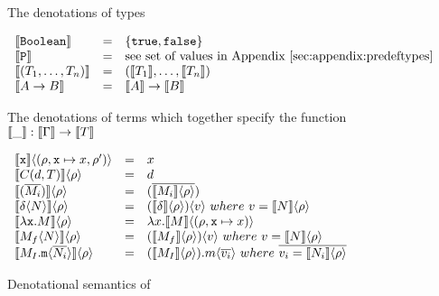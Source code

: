 \begin{figure}[h]
\caption{Denotational semantics of \corelang}
\label{fig:denotations}
The denotations of \corelang types

\begin{center}
  \(\begin{array}{ l c l }
  \Denot{\lst{Boolean}} & = & \{ \lst{true}, \lst{false} \}  \\	
  \Denot{\lst{P}} & = & \text{see set of values in Appendix~\ref{sec:appendix:predeftypes}} \\	
  \Denot{(T_1,\dots,T_n)} & = & (\Denot{T_1},\dots,\Denot{T_n})  \\	
  \Denot{A \to B} & = & \Denot{A} \to \Denot{B}  \\	
  \end{array}\)
\end{center}

The denotations of \corelang terms which together specify the function 
$\llbracket\_\rrbracket: \llbracket\Gamma\rrbracket \to \llbracket T\rrbracket$

\begin{center}
  \(\begin{array}{ l c l }
  \Apply{ \Denot{\lst{x}}			}{(\rho,\lst{x}\mapsto x, \rho')} & = & x \\	
  \Apply{ \Denot{C(d, T)} 			}{\rho} & = & d \\	
  \Apply{ \Denot{(\Ov{M_i})} 		}{\rho} & = & (\Ov{ \Apply{\Denot{M_i}}{\rho} }) \\	

  \Apply{ \Denot{\Apply{\delta}{N}} }{\rho} & = 
		& \Apply{ (\Apply{\Denot{\delta}}{\rho}) }{ v }~where~v = \Apply{\Denot{N}}{\rho} \\	

  \Apply{ \Denot{\Lam{\lst{x}}{M}}	}{\rho} & = 
		& \Lam{x}{ \Apply{\Denot{M}}{(\rho, \lst{x}\mapsto x)} } \\	

  \Apply{ \Denot{\Apply{M_f}{N}}	}{\rho} & = 
		& \Apply{ (\Apply{\Denot{M_f}}{\rho}) }{ v }~where~v = \Apply{\Denot{N}}{\rho} \\	

  \Apply{ \Denot{ \Apply{M_I.\lst{m}}{\Ov{N_i}} }	}{\rho} & = 
		& \Apply{ (\Apply{\Denot{M_I}}{\rho}).m }{ \Ov{v_i} }~where~\Ov{v_i = \Apply{\Denot{N_i}}{\rho}} \\	
  \end{array}\)
\end{center}
\end{figure}

